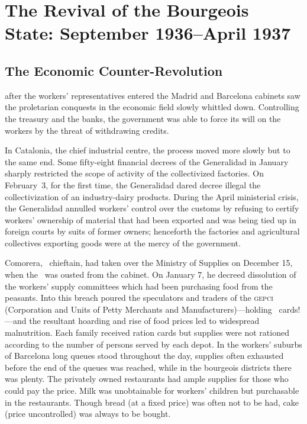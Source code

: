 \chapter[The Revival of the Bourgeois State]{The Revival of the Bourgeois State: September 1936--April 1937}

\section*{The Economic Counter-Revolution}

 after the workers’ representatives entered the Madrid and Barcelona cabinets saw the proletarian conquests in the economic field slowly whittled down. Controlling the treasury and the banks, the government was able to force its will on the workers by the threat of withdrawing credits.

In Catalonia, the chief industrial centre, the process moved more slowly but to the same end. Some fifty-eight financial decrees of the Generalidad in January sharply restricted the scope of activity of the collectivized factories. On February~3, for the first time, the Generalidad dared decree illegal the collectivization of an industry-dairy products. During the April ministerial crisis, the Generalidad annulled workers’ control over the customs by refusing to certify workers’ ownership of material that had been exported and was being tied up in foreign courts by suits of former owners; henceforth the factories and agricultural collectives exporting goods were at the mercy of the government.

Comorera, \PSUC\ chieftain, had taken over the Ministry of Supplies on December 15, when the \POUM\ was ousted from the cabinet. On January 7, he decreed dissolution of the workers’ supply committees which had been purchasing food from the peasants. Into this breach poured the speculators and traders of the \textsc{gepci} (Corporation and Units of Petty Merchants and Manufacturers)---holding \UGT\ cards!---and the resultant hoarding and rise of food prices led to widespread malnutrition. Each family received ration cards but supplies were not rationed according to the number of persons served by each depot. In the workers’ suburbs of Barcelona long queues stood throughout the day, supplies often exhausted before the end of the queues was reached, while in the bourgeois districts there was plenty. The privately owned restaurants had ample supplies for those who could pay the price. Milk was unobtainable for workers’ children but purchasable in the restaurants. Though bread (at a fixed price) was often not to be had, cake (price uncontrolled) was always to be bought.


